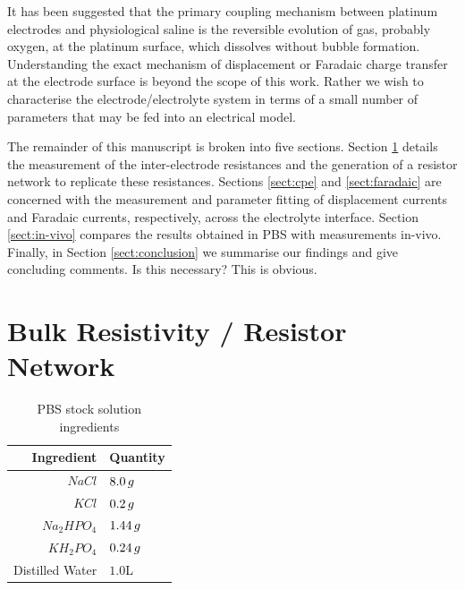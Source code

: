 \documentclass[journal, a4paper]{IEEEtran}
\begin{document}
It has been suggested that the primary coupling mechanism between platinum electrodes and physiological saline is the reversible evolution of gas, probably oxygen, at the platinum surface, which dissolves without bubble formation.\cite{Greatbatch1969} Understanding the exact mechanism of displacement or Faradaic charge transfer at the electrode surface is beyond the scope of this work. Rather we wish to characterise the electrode/electrolyte system in terms of a {\color{blue} small number of} parameters that may be fed into an electrical model.

{
    \color{blue}
    The remainder of this manuscript is broken into five sections. Section \ref{sect:resistorMesh} details the measurement of the inter-electrode resistances and the generation of a resistor network to replicate these resistances.
    Sections \ref{sect:cpe} and \ref{sect:faradaic} are concerned with the measurement and parameter fitting of displacement currents and Faradaic currents, respectively, across the electrolyte interface. Section \ref{sect:in-vivo} compares the results obtained in PBS with measurements in-vivo. Finally, in Section \ref{sect:conclusion} we summarise our findings and give concluding comments. {\color{red} Is this necessary? This is obvious.}
}


\section{{\color{blue}Bulk Resistivity / Resistor} Network }
\label{sect:resistorMesh}

\begin{table}
    \caption{PBS stock solution ingredients}
    \label{tab:PBSrecipe}
    \begin{center}
        \begin{tabular}{r | l}
            Ingredient & Quantity \\
            \hline
            $NaCl$ & $8.0\thinspace g$ \\
            $KCl$ & $0.2\thinspace g$ \\
            $Na_{2}HPO_{4}$ & $1.44\thinspace g$ \\
            $KH_{2}PO_{4}$ & $0.24\thinspace g$ \\
            Distilled Water & $1.0$\thinspace L \\
        \end{tabular}
    \end{center}
\end{table}
\end{document}
